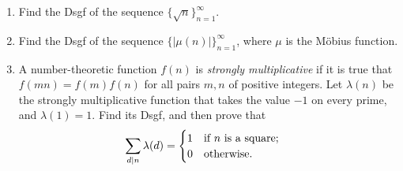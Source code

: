\begin{exercise}
    \begin{enumerate}[label=(\alph*)]
        \item Find the Dsgf of the sequence $\{\sqrt{n}\}_{n=1}^\infty$.
        \item Find the Dsgf of the sequence $\{|\mu(n)|\}_{n=1}^\infty$, where $\mu$ is the M{\"o}bius function.
        \item A number-theoretic function $f(n)$ is \emph{strongly multiplicative} if it is true that $f(mn) = f(m)f(n)$ for all pairs $m,n$ of positive integers. Let $\lambda(n)$ be the strongly multiplicative function that takes the value $-1$ on every prime, and $\lambda(1)=1$. Find its Dsgf, and then prove that
        \[
            \sum_{d\vert n}\lambda(d) = \begin{cases}
                1 \quad \textnormal{if $n$ is a square;} \\
                0 \quad \textnormal{otherwise.}
            \end{cases}
        \]
    \end{enumerate}
\end{exercise}

